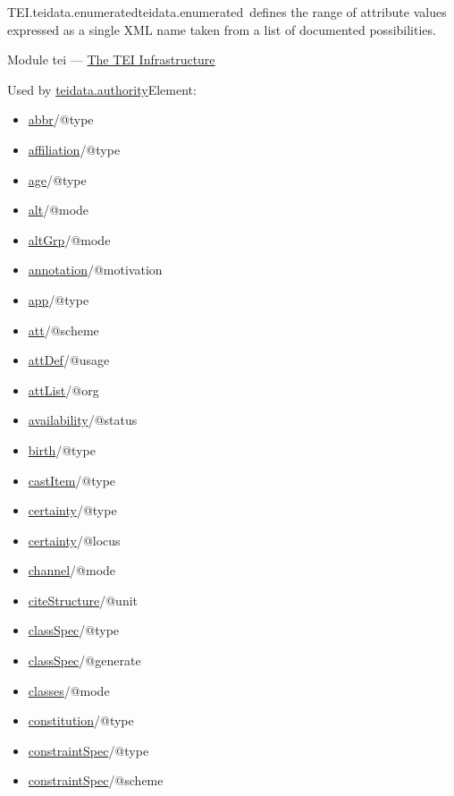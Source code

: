 \begin{reflist}
\item[]\begin{specHead}{TEI.teidata.enumerated}{teidata.enumerated} defines the range of attribute values expressed as a single XML name taken from a list of documented possibilities.\end{specHead} 
    \item[{Module}]
  tei — \hyperref[ST]{The TEI Infrastructure}
    \item[{Used by}]
  \hyperref[TEI.teidata.authority]{teidata.authority}Element: \begin{itemize}
\item \hyperref[TEI.abbr]{abbr}/@type
\item \hyperref[TEI.affiliation]{affiliation}/@type
\item \hyperref[TEI.age]{age}/@type
\item \hyperref[TEI.alt]{alt}/@mode
\item \hyperref[TEI.altGrp]{altGrp}/@mode
\item \hyperref[TEI.annotation]{annotation}/@motivation
\item \hyperref[TEI.app]{app}/@type
\item \hyperref[TEI.att]{att}/@scheme
\item \hyperref[TEI.attDef]{attDef}/@usage
\item \hyperref[TEI.attList]{attList}/@org
\item \hyperref[TEI.availability]{availability}/@status
\item \hyperref[TEI.birth]{birth}/@type
\item \hyperref[TEI.castItem]{castItem}/@type
\item \hyperref[TEI.certainty]{certainty}/@type
\item \hyperref[TEI.certainty]{certainty}/@locus
\item \hyperref[TEI.channel]{channel}/@mode
\item \hyperref[TEI.citeStructure]{citeStructure}/@unit
\item \hyperref[TEI.classSpec]{classSpec}/@type
\item \hyperref[TEI.classSpec]{classSpec}/@generate
\item \hyperref[TEI.classes]{classes}/@mode
\item \hyperref[TEI.constitution]{constitution}/@type
\item \hyperref[TEI.constraintSpec]{constraintSpec}/@type
\item \hyperref[TEI.constraintSpec]{constraintSpec}/@scheme

\end{itemize}
\end{reflist}

